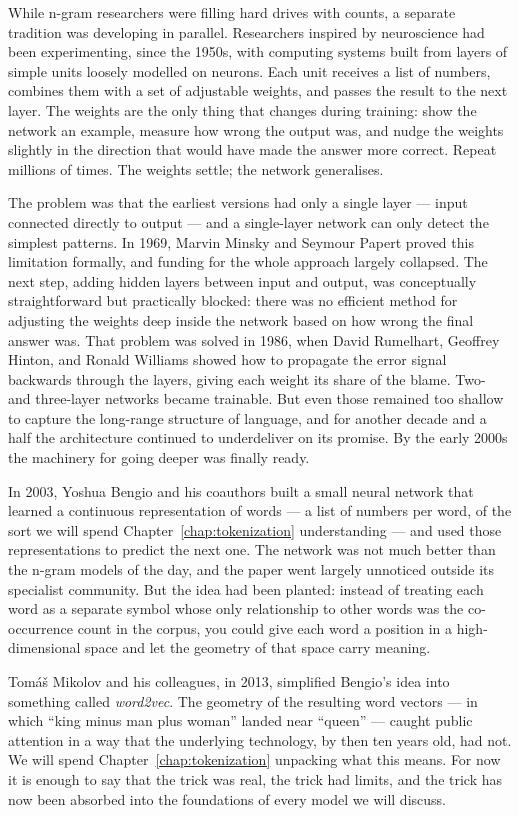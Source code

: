 While n-gram researchers were filling hard drives with counts,
a separate tradition was developing in parallel. Researchers
inspired by neuroscience had been experimenting, since the 1950s,
with computing systems built from layers of simple units loosely
modelled on neurons. Each unit receives a list of numbers,
combines them with a set of adjustable weights, and passes the
result to the next layer. The weights are the only thing that
changes during training: show the network an example, measure
how wrong the output was, and nudge the weights slightly in the
direction that would have made the answer more correct. Repeat
millions of times. The weights settle; the network generalises.

The problem was that the earliest versions had only a single
layer --- input connected directly to output --- and a
single-layer network can only detect the simplest patterns.
In 1969, Marvin Minsky and Seymour Papert proved this
limitation formally, and funding for the whole approach largely
collapsed. The next step, adding hidden layers between input
and output, was conceptually straightforward but practically
blocked: there was no efficient method for adjusting the weights
deep inside the network based on how wrong the final answer was.
That problem was solved in 1986, when David Rumelhart, Geoffrey
Hinton, and Ronald Williams showed how to propagate the error
signal backwards through the layers, giving each weight its
share of the blame. Two- and three-layer networks became
trainable. But even those remained too shallow to capture the
long-range structure of language, and for another decade and a
half the architecture continued to underdeliver on its promise.
By the early 2000s the machinery for going deeper was finally
ready.

In 2003, Yoshua Bengio and his coauthors
built a small neural network that learned a continuous
representation of words --- a list of numbers per word, of the
sort we will spend Chapter~\ref{chap:tokenization} understanding --- and used those
representations to predict the next one. The network was not
much better than the n-gram models of the day, and the paper
went largely unnoticed outside its specialist community. But
the idea had been planted: instead of treating each word as a
separate symbol whose only relationship to other words was the
co-occurrence count in the corpus, you could give each word a
position in a high-dimensional space and let the geometry of
that space carry meaning.

Tom\'a\v{s} Mikolov and his colleagues, in 2013, simplified
Bengio's idea into something called \emph{word2vec}. The
geometry of the resulting word vectors --- in which ``king minus
man plus woman'' landed near ``queen'' --- caught public
attention in a way that the underlying technology, by then ten
years old, had not. We will spend Chapter~\ref{chap:tokenization} unpacking what this
means. For now it is enough to say that the trick was real, the
trick had limits, and the trick has now been absorbed into the
foundations of every model we will discuss.

